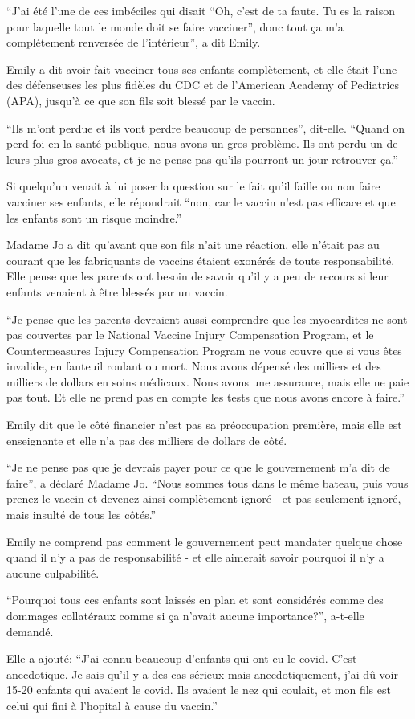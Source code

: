 “J'ai été l'une de ces imbéciles qui disait “Oh, c'est de ta faute. Tu es la
raison pour laquelle tout le monde doit se faire vacciner”, donc tout ça m'a
complétement renversée de l'intérieur”, a dit Emily.

Emily a dit avoir fait vacciner tous ses enfants complètement, et elle était
l'une des défenseuses les plus fidèles du CDC et de l'American Academy of
Pediatrics (APA), jusqu'à ce que son fils soit blessé par le vaccin.

“Ils m'ont perdue et ils vont perdre beaucoup de personnes”, dit-elle. “Quand on
perd foi en la santé publique, nous avons un gros problème. Ils ont perdu un de
leurs plus gros avocats, et je ne pense pas qu'ils pourront un jour retrouver
ça.”

Si quelqu'un venait à lui poser la question sur le fait qu'il faille ou non
faire vacciner ses enfants, elle répondrait “non, car le vaccin n'est pas
efficace et que les enfants sont un risque moindre.”

Madame Jo a dit qu'avant que son fils n'ait une réaction, elle n'était pas au
courant que les fabriquants de vaccins étaient exonérés de toute
responsabilité. Elle pense que les parents ont besoin de savoir qu'il y a peu de
recours si leur enfants venaient à être blessés par un vaccin.

“Je pense que les parents devraient aussi comprendre que les myocardites ne sont
pas couvertes par le National Vaccine Injury Compensation Program, et le
Countermeasures Injury Compensation Program ne vous couvre que si vous êtes
invalide, en fauteuil roulant ou mort. Nous avons dépensé des milliers et des
milliers de dollars en soins médicaux. Nous avons une assurance, mais elle ne
paie pas tout. Et elle ne prend pas en compte les tests que nous avons encore à
faire.”

Emily dit que le côté financier n'est pas sa préoccupation première, mais elle
est enseignante et elle n'a pas des milliers de dollars de côté.

“Je ne pense pas que je devrais payer pour ce que le gouvernement m'a dit de
faire”, a déclaré Madame Jo. “Nous sommes tous dans le même bateau, puis vous
prenez le vaccin et devenez ainsi complètement ignoré - et pas seulement ignoré,
mais insulté de tous les côtés.”

Emily ne comprend pas comment le gouvernement peut mandater quelque chose quand
il n'y a pas de responsabilité - et elle aimerait savoir pourquoi il n'y a
aucune culpabilité.

“Pourquoi tous ces enfants sont laissés en plan et sont considérés comme des
dommages collatéraux comme si ça n'avait aucune importance?”, a-t-elle demandé.

Elle a ajouté: “J'ai connu beaucoup d'enfants qui ont eu le covid. C'est
anecdotique. Je sais qu'il y a des cas sérieux mais anecdotiquement, j'ai dû
voir 15-20 enfants qui avaient le covid. Ils avaient le nez qui coulait, et mon
fils est celui qui fini à l'hopital à cause du vaccin.”

